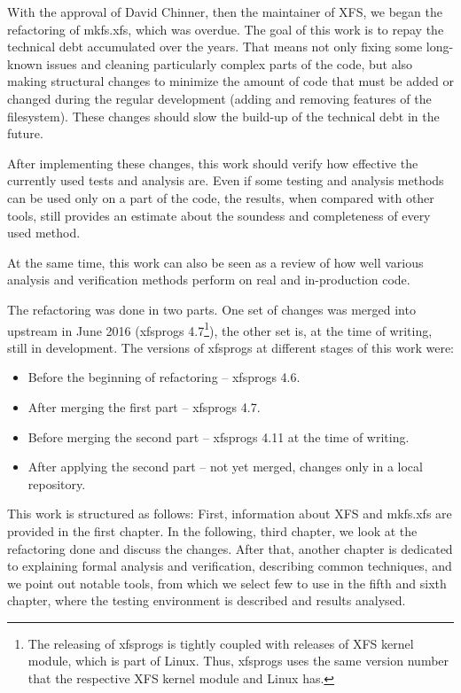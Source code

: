 With the approval of David Chinner, then the maintainer of XFS, we began the
refactoring of mkfs.xfs, which was overdue. The goal of this work is to
repay the technical debt accumulated over the years. That means not only
fixing some long-known issues and cleaning particularly complex parts of
the code, but also making structural changes to minimize the amount of code
that must be added or changed during the regular development (adding and
removing features of the filesystem). These changes should slow the build-up
of the technical debt in the future.

After implementing these changes, this work should verify how effective
the currently used tests and analysis are. Even if some testing and
analysis methods can be used only on a part of the code, the results, when
compared with other tools, still provides an estimate about the soundess
and completeness of every used method.

At the same time, this work can also be seen as a review of how well
various analysis and verification methods perform on real and in-production
code.

The refactoring was done in two parts. One set of changes was merged into
upstream in June 2016 (xfsprogs 4.7\footnote{The releasing of xfsprogs is
		tightly coupled with releases of XFS kernel module, which
		is part of Linux. Thus, xfsprogs uses the same version
		number that the respective XFS kernel module and Linux has.}),
the other set is, at the time of writing, still in development. The
versions of xfsprogs at different stages of this work were:
\begin{itemize}
\item Before the beginning of refactoring -- xfsprogs 4.6.
\item After merging the first part -- xfsprogs 4.7.
\item Before merging the second part -- xfsprogs 4.11 at the time of writing.
\item After applying the second part -- not yet merged, changes only in a local repository.
\end{itemize}

This work is structured as follows: First, information about XFS and
mkfs.xfs are provided in the first chapter. In the following, third chapter, we look
at the refactoring done and discuss the changes. After that, another
chapter is dedicated to explaining formal analysis and verification,
describing common techniques, and we point out notable tools, from which
we select few to use in the fifth and sixth chapter, where the testing
environment is described and results analysed.

